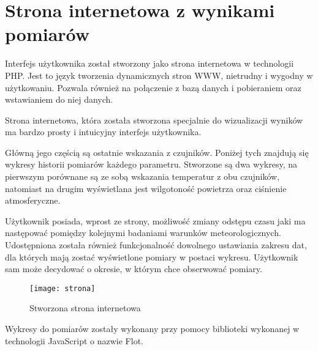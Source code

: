 \section{Strona internetowa z wynikami pomiarów}
Interfejs użytkownika został stworzony jako strona internetowa w technologii PHP. Jest to język tworzenia dynamicznych stron WWW, nietrudny i wygodny w użytkowaniu. Pozwala również na połączenie z bazą danych i pobieraniem oraz wstawianiem do niej danych.

Strona internetowa, która została stworzona specjalnie do wizualizacji wyników ma bardzo prosty i intuicyjny interfejs użytkownika.

Główną jego częścią są ostatnie wskazania z czujników. Poniżej tych znajdują się wykresy historii pomiarów każdego parametru. Stworzone są dwa wykresy, na pierwszym porównane są ze sobą wskazania temperatur z obu czujników, natomiast na drugim wyświetlana jest wilgotoność powietrza oraz ciśnienie atmosferyczne.

Użytkownik posiada, wprost ze strony, możliwość zmiany odstępu czasu jaki ma następować pomiędzy kolejnymi badaniami warunków meteorologicznych. Udostępniona została również funkcjonalność dowolnego ustawiania zakresu dat, dla których mają zostać wyświetlone pomiary w postaci wykresu. Użytkownik sam może decydować o okresie, w którym chce obserwować pomiary.
\begin{figure}[h!]
\centering
\texttt{[image: strona]}
\caption{Stworzona strona internetowa}
\label{fig:strona}
\end{figure}

Wykresy do pomiarów zostały wykonany przy pomocy biblioteki wykonanej w technologii JavaScript o nazwie Flot.